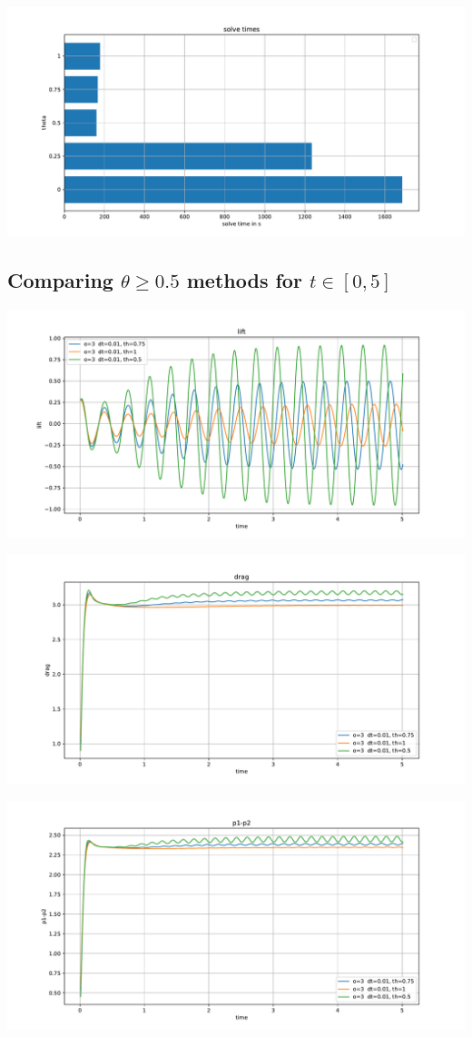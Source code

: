 \documentclass[11pt]{article}
\begin{document}
\includegraphics[width=0.75\columnwidth]{solve_times_theta}


\subsection{Comparing $\theta\geq 0.5$ methods for $t\in[0,5]$}

\includegraphics[width=0.75\columnwidth]{lift_full_implicit}

\includegraphics[width=0.75\columnwidth]{drag_full_implicit}

\includegraphics[width=0.75\columnwidth]{p1p2_full_implicit}
\end{document}
